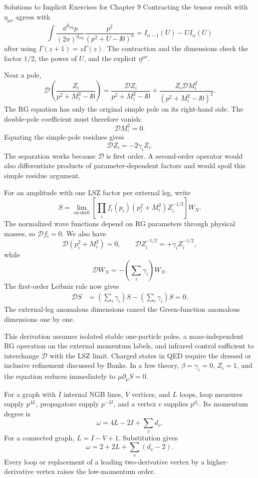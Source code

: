 \begin{bankssolutions}{Solutions to Implicit Exercises for Chapter 9}
Contracting the tensor result with $\eta_{\mu\nu}$ agrees with
\[
  \int\frac{\dd^{d_{\mathrm{reg}}}p}{(2\pi)^{d_{\mathrm{reg}}}}
  \frac{p^2}{(p^2+U-\ii0)^n}
  =I_{n-1}(U)-U I_n(U)
\]
after using $\Gamma(z+1)=z\Gamma(z)$.  The contraction and the dimensions
check the factor $1/2$, the power of $U$, and the explicit
$\eta^{\mu\nu}$.

Near a pole,
\[
  \mathcal D\left(\frac{Z_i}{p^2+M_i^2-\ii0}\right)
  =\frac{\mathcal D Z_i}{p^2+M_i^2-\ii0}
  +\frac{Z_i\mathcal D M_i^2}
  {(p^2+M_i^2-\ii0)^2}.
\]
The RG equation has only the original simple pole on its right-hand side.
The double-pole coefficient must therefore vanish:
\[
  \mathcal D M_i^2=0.
\]
Equating the simple-pole residues gives
\[
  \mathcal D Z_i=-2\gamma_iZ_i.
\]
The separation works because $\mathcal D$ is first order.  A second-order
operator would also differentiate products of parameter-dependent factors and
would spoil this simple residue argument.

For an amplitude with one LSZ factor per external leg, write
\[
  S=\lim_{\mathrm{on\ shell}}
  \left[\prod_i f_i(p_i)(p_i^2+M_i^2)Z_i^{-1/2}\right]W_N.
\]
The normalized wave functions depend on RG parameters through physical masses,
so $\mathcal Df_i=0$.  We also have
\[
  \mathcal D(p_i^2+M_i^2)=0,\qquad
  \mathcal D Z_i^{-1/2}=+\gamma_iZ_i^{-1/2},
\]
while
\[
  \mathcal DW_N=-\left(\sum_i\gamma_i\right)W_N.
\]
The first-order Leibniz rule now gives
\begin{align*}
  \mathcal DS
  &=\left(\sum_i\gamma_i\right)S
  -\left(\sum_i\gamma_i\right)S=0.
\end{align*}
The external-leg anomalous dimensions cancel the Green-function anomalous
dimensions one by one.

This derivation assumes isolated stable one-particle poles, a mass-independent
RG operation on the external momentum labels, and infrared control sufficient
to interchange $\mathcal D$ with the LSZ limit.  Charged states in QED require
the dressed or inclusive refinement discussed by Banks.  In a free theory,
$\beta=\gamma_i=0$, $Z_i=1$, and the equation reduces immediately to
$\mu\partial_\mu S=0$.

For a graph with $I$ internal NGB lines, $V$ vertices, and $L$ loops, loop
measures supply $p^{4L}$, propagators supply $p^{-2I}$, and a vertex $v$
supplies $p^{d_v}$.  Its momentum degree is
\[
  \omega=4L-2I+\sum_vd_v.
\]
For a connected graph, $L=I-V+1$.  Substitution gives
\[
  \omega=2+2L+\sum_v(d_v-2).
\]
Every loop or replacement of a leading two-derivative vertex by a
higher-derivative vertex raises the low-momentum order.


\end{bankssolutions}
